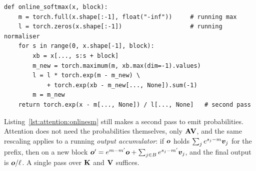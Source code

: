 \begin{lstlisting}[caption={Online softmax over blocks (Lab 4, Part E).},label={lst:attention:onlinesm}]
def online_softmax(x, block):
    m = torch.full(x.shape[:-1], float("-inf"))     # running max
    l = torch.zeros(x.shape[:-1])                   # running normaliser
    for s in range(0, x.shape[-1], block):
        xb = x[..., s:s + block]
        m_new = torch.maximum(m, xb.max(dim=-1).values)
        l = l * torch.exp(m - m_new) \
            + torch.exp(xb - m_new[..., None]).sum(-1)
        m = m_new
    return torch.exp(x - m[..., None]) / l[..., None]   # second pass
\end{lstlisting}

Listing~\ref{lst:attention:onlinesm} still makes a second pass to emit probabilities. Attention does
not need the probabilities themselves, only $\mathbf{A}\mathbf{V}$, and the same rescaling applies to a
running \emph{output accumulator}: if $\bm{o}$ holds $\sum_j e^{s_j-m}\bm{v}_j$ for the prefix,
then on a new block $\bm{o}' = e^{m-m'}\bm{o} + \sum_{j\in B}e^{s_j-m'}\bm{v}_j$, and the final
output is $\bm{o}/\ell$. A single pass over $\mathbf{K}$ and $\mathbf{V}$ suffices.

